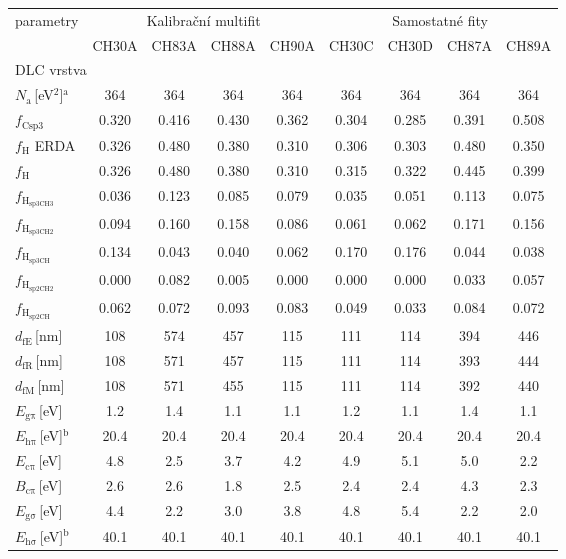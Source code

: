 \begin{tabular}{lcccccccc}
\hline
parametry & \multicolumn{4}{c}{Kalibrační multifit} & \multicolumn{4}{c}{Samostatné fity}\\
 & CH30A & CH83A & CH88A & CH90A & CH30C & CH30D & CH87A & CH89A\\
\hline
\multicolumn{9}{l}{DLC vrstva}\\
\hline
$N_\mathrm{a}$\,[eV$^2$]$^\mathrm{a}$ & 364 & 364 & 364 & 364 & 364 & 364 & 364 & 364\\
$f_\mathrm{Csp3}$ & 0.320 & 0.416 & 0.430 & 0.362 & 0.304 & 0.285 & 0.391 & 0.508\\
$f_\mathrm{H}$ ERDA & 0.326 & 0.480 & 0.380 & 0.310 & 0.306 & 0.303 & 0.480 & 0.350\\
$f_\mathrm{H}$ & 0.326 & 0.480 & 0.380 & 0.310 & 0.315 & 0.322 & 0.445 & 0.399\\
$f_\mathrm{H_{sp3CH3}}$ & 0.036 & 0.123 & 0.085 & 0.079 & 0.035 & 0.051 & 0.113 & 0.075\\
$f_\mathrm{H_{sp3CH2}}$ & 0.094 & 0.160 & 0.158 & 0.086 & 0.061 & 0.062 & 0.171 & 0.156\\
$f_\mathrm{H_{sp3CH}}$ & 0.134 & 0.043 & 0.040 & 0.062 & 0.170 & 0.176 & 0.044 & 0.038\\
$f_\mathrm{H_{sp2CH2}}$ & 0.000 & 0.082 & 0.005 & 0.000 & 0.000 & 0.000 & 0.033 & 0.057\\
$f_\mathrm{H_{sp2CH}}$ & 0.062 & 0.072 & 0.093 & 0.083 & 0.049 & 0.033 & 0.084 & 0.072\\
$d_\mathrm{fE}$\,[nm] & 108 & 574 & 457 & 115 & 111 & 114 & 394 & 446\\
$d_\mathrm{fR}$\,[nm] & 108 & 571 & 457 & 115 & 111 & 114 & 393 & 444\\
$d_\mathrm{fM}$\,[nm] & 108 & 571 & 455 & 115 & 111 & 114 & 392 & 440\\
$E_\mathrm{g\pi}$\,[eV] & 1.2 & 1.4 & 1.1 & 1.1 & 1.2 & 1.1 & 1.4 & 1.1\\
$E_\mathrm{h\pi}$\,[eV]$^\mathrm{b}$ & 20.4 & 20.4 & 20.4 & 20.4 & 20.4 & 20.4 & 20.4 & 20.4\\
$E_\mathrm{c\pi}$\,[eV] & 4.8 & 2.5 & 3.7 & 4.2 & 4.9 & 5.1 & 5.0 & 2.2\\
$B_\mathrm{c\pi}$\,[eV] & 2.6 & 2.6 & 1.8 & 2.5 & 2.4 & 2.4 & 4.3 & 2.3\\
$E_\mathrm{g\sigma}$\,[eV] & 4.4 & 2.2 & 3.0 & 3.8 & 4.8 & 5.4 & 2.2 & 2.0\\
$E_\mathrm{h\sigma}$\,[eV]$^\mathrm{b}$ & 40.1 & 40.1 & 40.1 & 40.1 & 40.1 & 40.1 & 40.1 & 40.1\\

\end{tabular}
